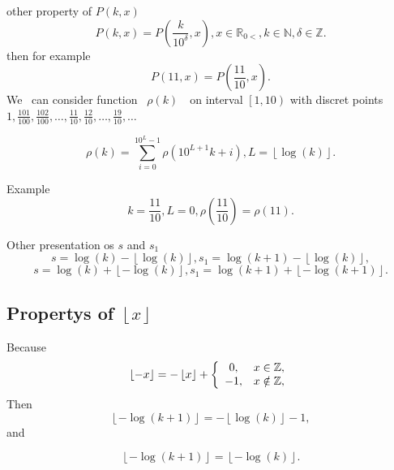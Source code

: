 \documentclass[titlepage,fleqn]{article}%
\providecommand{\U}[1]{\protect\rule{.1in}{.1in}}
\begin{document}
other property of $P(k,x)$%
\[
P(k,x)=P\left(  \frac{k}{10^{\delta}},x\right)  ,x\in%
\mathbb{R}
_{0<},k\in%
\mathbb{N}
,\delta\in%
\mathbb{Z}
.
\]
then for example%
\[
P(11,x)=P\left(  \frac{11}{10},x\right)  .
\]
We \ can consider function \ $\rho(k)$\ \ on interval $\left[  1,10\right)  $
with discret points $1,\frac{101}{100},\frac{102}{100},\ldots,\frac{11}%
{10},\frac{12}{10},\ldots,\frac{19}{10},\ldots$%

\[
\rho(k)=%
{\displaystyle\sum\limits_{i=0}^{10^{L}-1}}
\rho(10^{L+1}k+i),L=\left\lfloor \log\left(  k\right)  \right\rfloor .
\]


Example%
\[
k=\frac{11}{10},L=0,\rho\left(  \frac{11}{10}\right)  =\rho\left(  11\right)
.
\]


Other presentation os $s$ and $s_{1}$%
\[
s=\log(k)-\left\lfloor \log\left(  k\right)  \right\rfloor ,s_{1}%
=\log(k+1)-\left\lfloor \log\left(  k\right)  \right\rfloor ,
\]%
\[
s=\log(k)+\left\lfloor -\log\left(  k\right)  \right\rfloor ,s_{1}%
=\log(k+1)+\left\lfloor -\log\left(  k+1\right)  \right\rfloor .
\]


\subsection{\bigskip Propertys of $\left\lfloor x\right\rfloor $}

Because%
\[
\left\lfloor -x\right\rfloor =-\left\lfloor x\right\rfloor +\left\{
\begin{array}
[c]{cc}%
0, & x\in%
\mathbb{Z}
,\\
-1, & x\notin%
\mathbb{Z}
,
\end{array}
\right.
\]
Then%
\[
\left\lfloor -\log\left(  k+1\right)  \right\rfloor =-\left\lfloor \log\left(
k\right)  \right\rfloor -1,
\]
and%

\[
\left\lfloor -\log\left(  k+1\right)  \right\rfloor =\left\lfloor -\log\left(
k\right)  \right\rfloor .
\]
\end{document}
